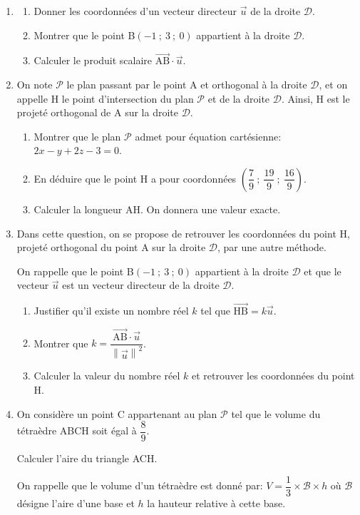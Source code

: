 \documentclass[10pt]{article}
\providecommand{\vect}[1]{\overrightarrow{#1}}
\begin{document}
\begin{enumerate}
\item 
	\begin{enumerate}
		\item Donner les coordonnées d'un vecteur directeur $\vect{u}$ de la droite $\mathcal{D}$.
		

		\item Montrer que le point B$(-1~;~3~;~0)$ appartient à la droite $\mathcal{D}$.
		\item Calculer le produit scalaire $\vect{\text{AB}} \cdot \vect{u}$.
	\end{enumerate}	
\item On note $\mathcal{P}$ le plan passant par le point A et orthogonal à la droite $\mathcal{D}$, et on appelle H le point d'intersection du plan $\mathcal{P}$ et de la droite $\mathcal{D}$. Ainsi, H est le projeté orthogonal de A sur la droite $\mathcal{D}$.
	\begin{enumerate}
		\item Montrer que le plan $\mathcal{P}$ admet pour équation cartésienne: $2x - y + 2z - 3 = 0$.
		\item En déduire que le point H a pour coordonnées $\left(\dfrac79~;~\dfrac{19}{9}~;~\dfrac{16}{9}\right)$.
		\item Calculer la longueur AH. On donnera une valeur exacte.
	\end{enumerate}	
\item Dans cette question, on se propose de retrouver les coordonnées du point H, projeté orthogonal du point A sur la droite $\mathcal{D}$, par une autre méthode.

On rappelle que le point B$(-1~;~3~;~0)$ appartient à la droite $\mathcal{D}$ et que le vecteur $\vect{u}$ est un vecteur directeur de la droite $\mathcal{D}$.
	\begin{enumerate}
		\item Justifier qu'il existe un nombre réel $k$ tel que $\vect{\text{HB}} = k\vect{u}$.
		\item Montrer que $k = \dfrac{\vect{\text{AB}} \cdot \vect{u}}{\left\|\vect{u}\right\|^2}$.
		\item Calculer la valeur du nombre réel $k$ et retrouver les coordonnées du point H.
	\end{enumerate}
\item On considère un point C appartenant au plan $\mathcal{P}$ tel que le volume du tétraèdre ABCH soit égal à $\dfrac89$.

Calculer l'aire du triangle ACH.

On rappelle que le volume d'un tétraèdre est donné par: $V = \dfrac13 \times \mathcal{B} \times h$ où $\mathcal{B}$ désigne l'aire d'une base et $h$ la hauteur relative à cette base.
\end{enumerate}

\bigskip
\end{document}
